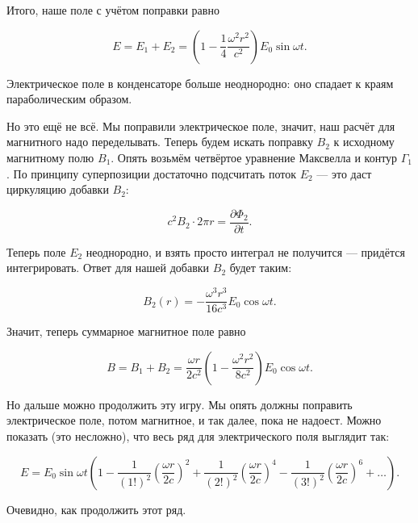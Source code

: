 \documentclass[12pt,a4paper]{article}
\numberwithin{equation}{section}
\numberwithin{equation}{section}
\newcommand{\pt}{\partial}
\begin{document}
Итого, наше поле с учётом поправки равно 

\begin{equation}
  \label{eq:cond_5}
  E = E_1 + E_2 = \left( 1 - \frac{1}{4}\frac{\omega^2 r^2}{c^2}
  \right) E_0 \sin \omega t. 
\end{equation}

Электрическое поле в конденсаторе больше неоднородно: оно спадает к
краям параболическим образом. 

Но это ещё не всё. Мы поправили электрическое поле, значит, наш расчёт
для магнитного надо переделывать. Теперь будем искать поправку $B_2$ к
исходному магнитному полю $B_1$. Опять возьмём четвёртое уравнение
Максвелла и контур $\Gamma_1$. По принципу суперпозиции достаточно
подсчитать поток $E_2$ --- это даст циркуляцию добавки $B_2$:

\begin{equation}
  \label{eq:cond_6}
  c^2 B_2 \cdot 2\pi r = \frac{\pt \Phi_2}{\pt t}.
\end{equation}

Теперь поле $E_2$ неоднородно, и взять просто интеграл не получится
--- придётся интегрировать. Ответ для нашей добавки $B_2$ будет таким:

\begin{equation}
  \label{eq:cond_7}
  B_2 (r) = -\frac{\omega^3 r^3}{16 c^3} E_0 \cos \omega t.
\end{equation}

Значит, теперь суммарное магнитное поле равно

\begin{equation}
  \label{eq:cond_8}
  B = B_1 + B_2 = \frac{\omega r }{2c^2} \left(1-\frac{\omega^2 r^2}{8c^2} \right) E_0 \cos \omega t.
\end{equation}

Но дальше можно продолжить эту игру. Мы опять должны поправить
электрическое поле, потом магнитное, и так далее, пока не
надоест. Можно показать (это несложно), что весь ряд для
электрического поля выглядит так: 

\begin{equation}
  \label{eq:cond_9}
  E = E_0 \sin \omega t \left( 1- \frac{1}{(1!)^2} \left( \frac{\omega
      r}{2c} \right)^2 + \frac{1}{(2!)^2} \left( \frac{\omega
      r}{2c} \right)^4 - \frac{1}{(3!)^2} \left( \frac{\omega
      r}{2c} \right)^6 + \ldots \right).
\end{equation}

Очевидно, как продолжить этот ряд. 
\end{document}
